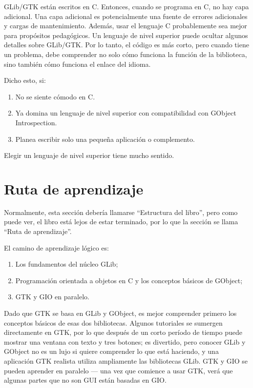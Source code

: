 GLib/GTK están escritos en C. Entonces, cuando se programa en C, no hay capa adicional. Una capa adicional es potencialmente una fuente de errores adicionales y cargas de mantenimiento. Además, usar el lenguaje C probablemente sea mejor para propósitos pedagógicos. Un lenguaje de nivel superior puede ocultar algunos detalles sobre GLib/GTK. Por lo tanto, el código es más corto, pero cuando tiene un problema, debe comprender no solo cómo funciona la función de la biblioteca, sino también cómo funciona el enlace del idioma.

Dicho esto, si:

\begin{enumerate}
    \item No se siente cómodo en C.
    \item Ya domina un lenguaje de nivel superior con compatibilidad con GObject Introspection.
    \item Planea escribir solo una pequeña aplicación o complemento.
\end{enumerate}

Elegir un lenguaje de nivel superior tiene mucho sentido.

\section{Ruta de aprendizaje}
\label{intro-learning-path}

Normalmente, esta sección debería llamarse ``Estructura del libro'', pero como puede ver, el libro está lejos de estar terminado, por lo que la sección se llama ``Ruta de aprendizaje''.

El camino de aprendizaje lógico es:
\begin{enumerate}
    \item Los fundamentos del núcleo GLib;
    \item Programación orientada a objetos en C y los conceptos básicos de GObject;
    \item GTK y GIO en paralelo.
\end{enumerate}

Dado que GTK se basa en GLib y GObject, es mejor comprender primero los conceptos básicos de esas dos bibliotecas. Algunos tutoriales se sumergen directamente en GTK, por lo que después de un corto período de tiempo puede mostrar una ventana con texto y tres botones; es divertido, pero conocer GLib y GObject no es un lujo si quiere comprender lo que está haciendo, y una aplicación GTK realista utiliza ampliamente las bibliotecas GLib. GTK y GIO se pueden aprender en paralelo --- una vez que comience a usar GTK, verá que algunas partes que no son GUI están basadas en GIO.


